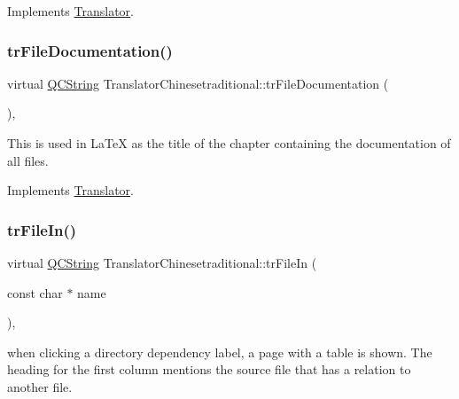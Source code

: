 Implements \mbox{\hyperlink{class_translator}{Translator}}.

\mbox{\label{class_translator_chinesetraditional_ad7dc1ff0496b4035b4d12ac73df6b38c}} 
\subsubsection{\texorpdfstring{trFileDocumentation()}{trFileDocumentation()}}
{\footnotesize\ttfamily virtual \mbox{\hyperlink{class_q_c_string}{Q\+C\+String}} Translator\+Chinesetraditional\+::tr\+File\+Documentation (\begin{DoxyParamCaption}{ }\end{DoxyParamCaption})\hspace{0.3cm}{\ttfamily [inline]}, {\ttfamily [virtual]}}

This is used in La\+TeX as the title of the chapter containing the documentation of all files. 

Implements \mbox{\hyperlink{class_translator}{Translator}}.

\mbox{\label{class_translator_chinesetraditional_a77a64b93b8ae15e492ce3481ebb54490}} 
\subsubsection{\texorpdfstring{trFileIn()}{trFileIn()}}
{\footnotesize\ttfamily virtual \mbox{\hyperlink{class_q_c_string}{Q\+C\+String}} Translator\+Chinesetraditional\+::tr\+File\+In (\begin{DoxyParamCaption}\item[{const char $\ast$}]{name }\end{DoxyParamCaption})\hspace{0.3cm}{\ttfamily [inline]}, {\ttfamily [virtual]}}

when clicking a directory dependency label, a page with a table is shown. The heading for the first column mentions the source file that has a relation to another file. 

